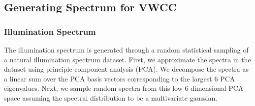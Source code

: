 \documentclass{jov}
\begin{document}
\subsection{Generating Spectrum for VWCC}
\subsubsection{Illumination Spectrum}
The illumination spectrum is generated through a random statistical sampling of a natural illumination spectrum dataset. First, we approximate the spectra in the dataset using principle component analysis (PCA). We decompose the spectra as a linear sum over the PCA basis vectors corresponding to the largest 6 PCA eigenvalues. Next, we sample random spectra from this low 6 dimensional PCA space assuming the spectral distribution to be a multivariate gaussian.
\end{document}
